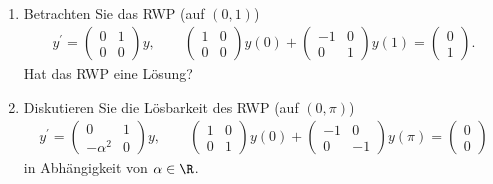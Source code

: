\begin{exercise}
\leavevmode \\
\begin{enumerate}[label = \textbf{\alph*)}]
  \item Betrachten Sie das RWP (auf $(0,1)$)
  \begin{align*}
    y^{\prime} = \begin{pmatrix}
      0 & 1 \\ 0 & 0
    \end{pmatrix}y, \qquad
    \begin{pmatrix}
      1 & 0 \\ 0 & 0
    \end{pmatrix}y(0)
    + \begin{pmatrix}
      -1 & 0 \\ 0 & 1
    \end{pmatrix}y(1)
    = \begin{pmatrix}
      0 \\ 1
    \end{pmatrix}.
  \end{align*}
  Hat das RWP eine Lösung?
  \item Diskutieren Sie die Lösbarkeit des RWP (auf $(0,\pi)$)
  \begin{align*}
  y^{\prime} = \begin{pmatrix}
    0 & 1 \\ -\alpha^2 & 0
  \end{pmatrix}y, \qquad
  \begin{pmatrix}
    1 & 0 \\ 0 & 1
  \end{pmatrix}y(0)
  + \begin{pmatrix}
    -1 & 0 \\ 0 & -1
  \end{pmatrix}y(\pi)
  = \begin{pmatrix}
    0 \\ 0
  \end{pmatrix}
  \end{align*}
  in Abhängigkeit von $\alpha \in \R$.
\end{enumerate}
\end{exercise}
